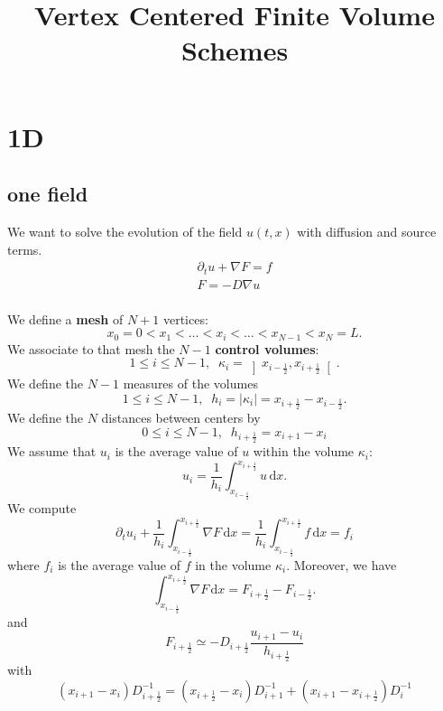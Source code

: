 \documentclass[aps,onecolumn]{revtex4}
\newcommand{\half}{\frac{1}{2}}
\newcommand{\myd}{\,\text{d}}
\begin{document}
\title{Vertex Centered Finite Volume Schemes}

\maketitle
\tableofcontents

\section{1D}
\subsection{one field}
We want to solve the evolution of the field $u(t,x)$ with diffusion and source terms.
\begin{equation}
	\begin{array}{l}
		\partial_t u + \nabla F = f\\
		F = -D \nabla u\\
	\end{array}
\end{equation}

We define a {\bf mesh} of $N+1$ vertices:
\begin{equation}
x_0=0<x_1<\ldots<x_i<\ldots<x_{N-1}<x_N=L.
\end{equation}
We associate to that mesh the $N-1$ {\bf control volumes}:
\begin{equation}
 1\leq i \leq N-1, \;\; \kappa_{i}=\left\rbrack x_{i-\half}, x_{i+\half}\right\lbrack.
\end{equation}
We define the $N-1$ measures of the volumes
\begin{equation}
 1\leq i \leq N-1, \;\; h_i=\vert \kappa_i \vert=x_{i+\half} - x_{i-\half}.
\end{equation}
We define the $N$ distances between centers by
\begin{equation}
	0\leq i \leq N-1,\;\; h_{i+\half} = x_{i+1} - x_{i}
\end{equation}
We assume that $u_i$ is the average value of $u$ within the volume $\kappa_i$:
\begin{equation}
	u_i = \dfrac{1}{h_i}\int_{x_{i-\half}}^{x_{i+\half}} u\myd x.
\end{equation}
We compute
\begin{equation}
	\partial_t u_i + \dfrac{1}{h_i} \int_{x_{i-\half}}^{x_{i+\half}} \nabla F \myd x = \dfrac{1}{h_i} \int_{x_{i-\half}}^{x_{i+\half}} f \myd x = f_i
\end{equation}
where $f_i$ is the average value of $f$ in the volume $\kappa_i$.
Moreover, we have
\begin{equation}
	\int_{x_{i-\half}}^{x_{i+\half}} \nabla F \myd x = F_{i+\half} - F_{i-\half}.
\end{equation}
and
\begin{equation}
	F_{i+\half} \simeq - D_{i+\half} \dfrac{u_{i+1}-u_{i}}{h_{i+\half}} 
\end{equation}
with 
\begin{equation}
	\left(x_{i+1}-x_{i}\right) D_{i+\half}^{-1} = \left(x_{i+\half}-x_i\right) D_{i+1}^{-1} + \left(x_{i+1} - x_{i+\half}\right) D_{i}^{-1}
\end{equation}
\end{document}
